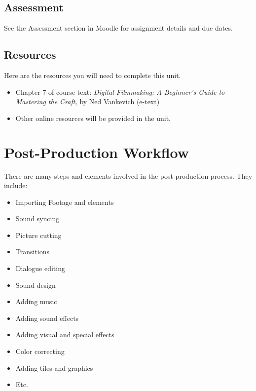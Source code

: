 \documentclass[
]{book}
\providecommand{\tightlist}{%
  \setlength{\itemsep}{0pt}\setlength{\parskip}{0pt}}
\begin{document}
\hypertarget{assessment-12}{%
\subsection*{Assessment}\label{assessment-12}}

See the Assessment section in Moodle for assignment details and due dates.

\hypertarget{resources-6}{%
\subsection*{Resources}\label{resources-6}}

Here are the resources you will need to complete this unit.

\begin{itemize}
\tightlist
\item
  Chapter 7 of course text: \emph{Digital Filmmaking: A Beginner's Guide to Mastering the Craft,} by Ned Vankevich (e-text)
\item
  Other online resources will be provided in the unit.
\end{itemize}

\hypertarget{post-production-workflow}{%
\section{Post-Production Workflow}\label{post-production-workflow}}

There are many steps and elements involved in the post-production process. They include:

\begin{itemize}
\tightlist
\item
  Importing Footage and elements\\
\item
  Sound syncing\\
\item
  Picture cutting\\
\item
  Transitions\\
\item
  Dialogue editing\\
\item
  Sound design\\
\item
  Adding music\\
\item
  Adding sound effects\\
\item
  Adding visual and special effects\\
\item
  Color correcting\\
\item
  Adding tiles and graphics\\
\item
  Etc.
\end{itemize}
\end{document}
